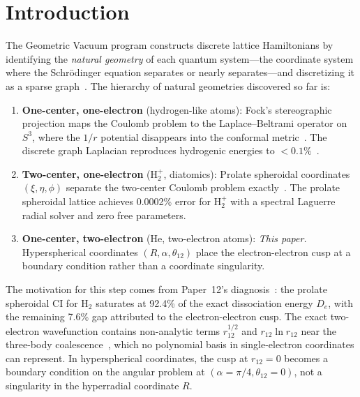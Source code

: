 \documentclass[aps,pra,twocolumn,superscriptaddress,longbibliography]{revtex4-2}
\begin{document}
\maketitle


\section{Introduction}
\label{sec:intro}

The Geometric Vacuum program constructs discrete lattice
Hamiltonians by identifying the \emph{natural geometry} of each
quantum system---the coordinate system where the Schr\"odinger
equation separates or nearly separates---and discretizing it as a
sparse graph~\cite{loutey_paper0, loutey_paper1, loutey_paper7}.
The hierarchy of natural geometries discovered so far is:
\begin{enumerate}
  \item \textbf{One-center, one-electron} (hydrogen-like atoms):
    Fock's stereographic projection maps the Coulomb problem to the
    Laplace--Beltrami operator on $S^3$, where the $1/r$ potential
    disappears into the conformal metric~\cite{Fock1935,
    loutey_paper7}.  The discrete graph Laplacian reproduces
    hydrogenic energies to $< 0.1\%$~\cite{loutey_paper0,
    loutey_paper1}.

  \item \textbf{Two-center, one-electron} (H$_2^+$, diatomics):
    Prolate spheroidal coordinates $(\xi, \eta, \phi)$ separate the
    two-center Coulomb problem exactly~\cite{loutey_paper11}.  The
    prolate spheroidal lattice achieves 0.0002\% error for H$_2^+$
    with a spectral Laguerre radial solver and zero free parameters.

  \item \textbf{One-center, two-electron} (He, two-electron atoms):
    \emph{This paper.}  Hyperspherical coordinates $(R, \alpha,
    \theta_{12})$ place the electron-electron cusp at a boundary
    condition rather than a coordinate singularity.
\end{enumerate}

The motivation for this step comes from Paper~12's
diagnosis~\cite{loutey_paper12}: the prolate spheroidal CI for H$_2$
saturates at 92.4\% of the exact dissociation energy $D_e$, with the
remaining 7.6\% gap attributed to the electron-electron cusp.  The
exact two-electron wavefunction contains non-analytic terms
$r_{12}^{1/2}$ and $r_{12}\ln r_{12}$ near the three-body
coalescence~\cite{Fock1954}, which no polynomial basis in
single-electron coordinates can represent.  In hyperspherical
coordinates, the cusp at $r_{12} = 0$ becomes a boundary condition
on the angular problem at $(\alpha = \pi/4, \theta_{12} = 0)$, not a
singularity in the hyperradial coordinate $R$.
\end{document}
